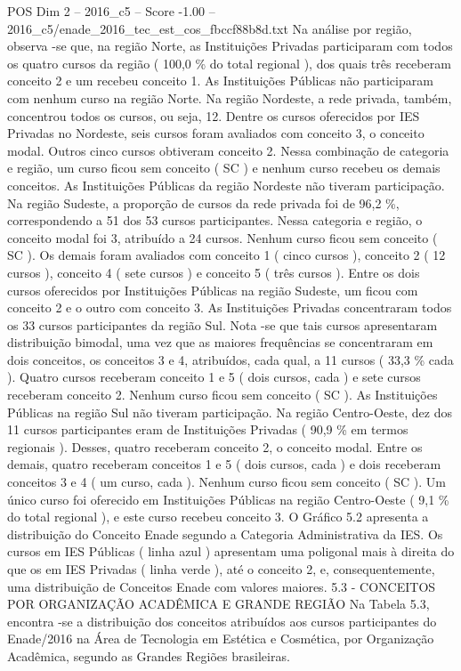 \begin{textsample}{POS Dim 2 – 2016\_c5 – Score -1.00 – 2016\_c5/enade\_2016\_tec\_est\_cos\_fbccf88b8d.txt}
Na análise por região, observa -se que, na região Norte, as Instituições Privadas participaram com todos os quatro cursos da região ( 100,0 \% do total regional ), dos quais três receberam conceito 2 e um recebeu conceito 1.
As Instituições Públicas não participaram com nenhum curso na região Norte.
Na região Nordeste, a rede privada, também, concentrou todos os cursos, ou seja, 12.
Dentre os cursos oferecidos por IES Privadas no Nordeste, seis cursos foram avaliados com conceito 3, o conceito modal.
Outros cinco cursos obtiveram conceito 2.
Nessa combinação de categoria e região, um curso ficou sem conceito ( SC ) e nenhum curso recebeu os demais conceitos.
As Instituições Públicas da região Nordeste não tiveram participação.
Na região Sudeste, a proporção de cursos da rede privada foi de 96,2 \%, correspondendo a 51 dos 53 cursos participantes.
Nessa categoria e região, o conceito modal foi 3, atribuído a 24 cursos.
Nenhum curso ficou sem conceito ( SC ).
Os demais foram avaliados com conceito 1 ( cinco cursos ), conceito 2 ( 12 cursos ), conceito 4 ( sete cursos ) e conceito 5 ( três cursos ).
Entre os dois cursos oferecidos por Instituições Públicas na região Sudeste, um ficou com conceito 2 e o outro com conceito 3.
As Instituições Privadas concentraram todos os 33 cursos participantes da região Sul.
Nota -se que tais cursos apresentaram distribuição bimodal, uma vez que as maiores frequências se concentraram em dois conceitos, os conceitos 3 e 4, atribuídos, cada qual, a 11 cursos ( 33,3 \% cada ).
Quatro cursos receberam conceito 1 e 5 ( dois cursos, cada ) e sete cursos receberam conceito 2.
Nenhum curso ficou sem conceito ( SC ).
As Instituições Públicas na região Sul não tiveram participação.
Na região Centro-Oeste, dez dos 11 cursos participantes eram de Instituições Privadas ( 90,9 \% em termos regionais ).
Desses, quatro receberam conceito 2, o conceito modal.
Entre os demais, quatro receberam conceitos 1 e 5 ( dois cursos, cada ) e dois receberam conceitos 3 e 4 ( um curso, cada ).
Nenhum curso ficou sem conceito ( SC ).
Um único curso foi oferecido em Instituições Públicas na região Centro-Oeste ( 9,1 \% do total regional ), e este curso recebeu conceito 3.
O Gráfico 5.2 apresenta a distribuição do Conceito Enade segundo a Categoria Administrativa da IES.
Os cursos em IES Públicas ( linha azul ) apresentam uma poligonal mais à direita do que os em IES Privadas ( linha verde ), até o conceito 2, e, consequentemente, uma distribuição de Conceitos Enade com valores maiores. 5.3 - CONCEITOS POR ORGANIZAÇÃO ACADÊMICA E GRANDE REGIÃO Na Tabela 5.3, encontra -se a distribuição dos conceitos atribuídos aos cursos participantes do Enade/2016 na Área de Tecnologia em Estética e Cosmética, por Organização Acadêmica, segundo as Grandes Regiões brasileiras.

\end{textsample}
